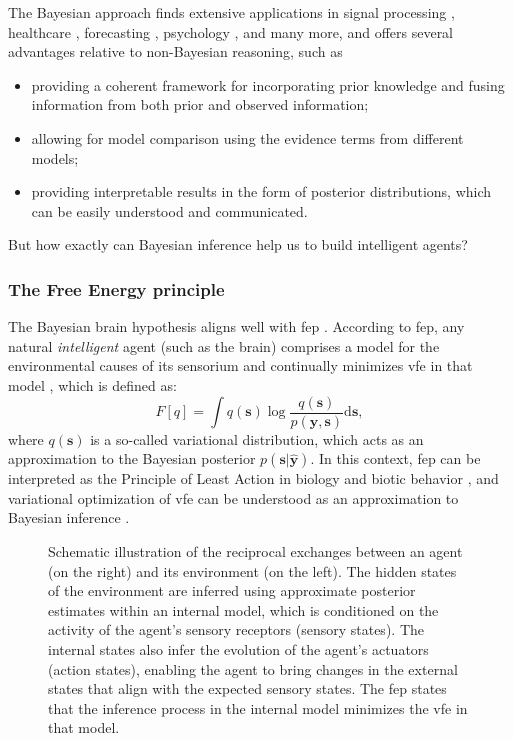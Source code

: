 The Bayesian approach finds extensive applications in signal processing \citep{bagautdinov_machine_2013}, healthcare \citep{lu_bayesian_2018}, forecasting \citep{berninger_bayesian_2020}, psychology \citep{wagenmakers_bayesian_2018}, and many more, and offers several advantages relative to non-Bayesian reasoning, such as
\begin{itemize}
    \item providing a coherent framework for incorporating prior knowledge and fusing information from
both prior and observed information;
    \item allowing for model comparison using the evidence terms from different models;
    \item providing interpretable results in the form of posterior distributions, which can be easily understood and communicated.
\end{itemize}
But how exactly can Bayesian inference help us to build intelligent agents?

\subsubsection{The Free Energy principle}

The Bayesian brain hypothesis aligns well with \ac{fep} \citep{friston_free_2006}.
According to \ac{fep}, any natural \textit{intelligent} agent (such as the brain) comprises a
model for the environmental causes of its sensorium and continually minimizes \ac{vfe} in that model \citep{sims_modelling_2021}, which is defined as:
\begin{equation}
    F[q] = \int q(\bm{s}) \log \frac{q(\bm{s})}{p(\bm{y}, \bm{s})} \mathrm{d}\bm{s},
\end{equation}
where $q(\bm{s})$ is a so-called variational distribution, which acts as an approximation to the Bayesian posterior $p(\bm{s}\vert\hat{\bm{y}})$.
In this context, \ac{fep} can be interpreted as the Principle of Least Action in biology and biotic behavior \citep{FRISTON20231}, and variational optimization of \ac{vfe} can be understood as an approximation to Bayesian inference \citep{friston_free-energy_2007}.

\begin{figure}
  \centering
  \resizebox{0.85\textwidth}{!}{}
  \caption{Schematic illustration of the reciprocal exchanges between an agent (on the right) and its environment (on the left).
    The hidden states of the environment are inferred using approximate posterior estimates within
    an internal model, which is conditioned on the activity of the agent's sensory receptors
    (sensory states).
    The internal states also infer the evolution of the agent's actuators (action states),
    enabling the agent to bring changes in the external states that align with the expected
    sensory states.
    The \acl{fep} states that the inference process in the internal model minimizes
    the \acl{vfe} in that model.
  }
  \label{fig:intro:fep}
\end{figure}


